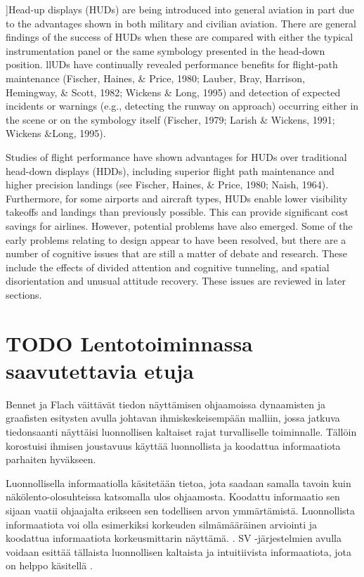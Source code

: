 \documentclass[utf8,bachelor,manualbib]{gradu3}
\begin{document}
]Head-up displays (HUDs) are being introduced into general aviation in part due to
the advantages shown in both military and civilian aviation. There are general
findings of the success of HUDs when these are compared with either the typical
instrumentation panel or the same symbology presented in the head-down position.
llUDs have continually revealed performance benefits for flight-path maintenance
(Fischer, Haines, \& Price, 1980; Lauber, Bray, Harrison, Hemingway, \& Scott, 1982; Wickens \& Long, 1995) and detection of expected incidents or warnings
(e.g., detecting the runway on approach) occurring either in the scene or on the
symbology itself (Fischer, 1979; Larish \& Wickens, 1991; Wickens \&Long, 1995).

Studies of flight performance have shown advantages for HUDs over traditional
head-down displays (HDDs), including superior flight path maintenance
and higher precision landings (see Fischer, Haines, \& Price, 1980; Naish, 1964).
Furthermore, for some airports and aircraft types, HUDs enable lower visibility
takeoffs and landings than previously possible. This can provide significant cost
savings for airlines. However, potential problems have also emerged. Some of the
early problems relating to design appear to have been resolved, but there are a
number of cognitive issues that are still a matter of debate and research. These include
the effects of divided attention and cognitive tunneling, and spatial disorientation
and unusual attitude recovery. These issues are reviewed in later sections. \citep{crawfordneal2006}

\section{TODO Lentotoiminnassa saavutettavia etuja}

Bennet ja Flach \citeyearpar{bennetflach1994} väittävät tiedon näyttämisen ohjaamoissa dynaamisten ja graafisten esitysten avulla johtavan ihmiskeskeisempään malliin, jossa jatkuva tiedonsaanti näyttäisi luonnollisen kaltaiset rajat turvalliselle toiminnalle. Tällöin korostuisi ihmisen joustavuus käyttää luonnollista ja koodattua informaatiota parhaiten hyväkseen.

Luonnollisella informaatiolla käsitetään tietoa, jota saadaan samalla tavoin kuin näkölento-olosuhteissa katsomalla ulos ohjaamosta. Koodattu informaatio sen sijaan vaatii ohjaajalta erikseen sen todellisen arvon ymmärtämistä. Luonnollista informaatiota voi olla esimerkiksi korkeuden silmämääräinen arviointi ja koodattua informaatiota korkeusmittarin näyttämä. \citep{prinzel2004}. SV -järjestelmien avulla voidaan esittää tällaista luonnollisen kaltaista ja intuitiivista informaatiota, jota on helppo käsitellä \citep{wickensandre1990}.
\end{document}
